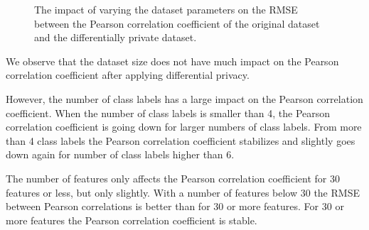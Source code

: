 \begin{figure}[H]%
    \centering
    \qquad
    \qquad
    \caption{The impact of varying the dataset parameters on the RMSE between the Pearson correlation coefficient of the original dataset and the differentially private dataset.}%
    \label{fig:datasetparams}%
\end{figure}

We observe that the dataset size does not have much impact on the Pearson correlation coefficient after applying differential privacy. 

However, the number of class labels has a large impact on the Pearson correlation coefficient. When the number of class labels is smaller than 4, the Pearson correlation coefficient is going down for larger numbers of class labels. From more than 4 class labels the Pearson correlation coefficient stabilizes and slightly goes down again for number of class labels higher than 6.

The number of features only affects the Pearson correlation coefficient for 30 features or less, but only slightly. With a number of features below 30 the RMSE between Pearson correlations is better than for 30 or more features. For 30 or more features the Pearson correlation coefficient is stable.\\

